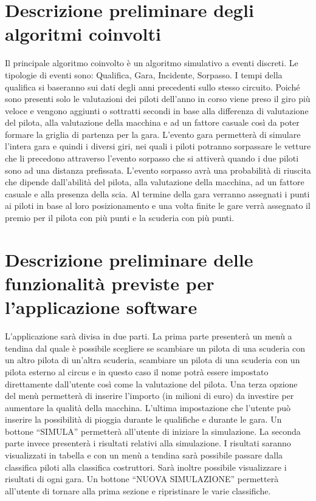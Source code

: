 \section[Descrizione preliminare degli algoritmi coinvolti]{Descrizione preliminare degli algoritmi coinvolti} %
Il principale algoritmo coinvolto è un algoritmo simulativo a eventi discreti. Le tipologie di eventi sono: Qualifica, Gara, Incidente, Sorpasso. I tempi della qualifica si baseranno sui dati degli anni precedenti sullo stesso circuito. Poiché sono presenti solo le valutazioni dei piloti dell’anno in corso viene preso il giro più veloce e vengono aggiunti o sottratti secondi in base alla differenza di valutazione del pilota, alla valutazione della macchina e ad un fattore casuale così da poter formare la griglia di partenza per la gara. L’evento gara permetterà di simulare l’intera gara e quindi i diversi giri, nei quali i piloti potranno sorpassare le vetture che li precedono attraverso l’evento sorpasso che si attiverà quando i due piloti sono ad una distanza prefissata. L’evento sorpasso avrà una probabilità di riuscita che dipende dall’abilità del pilota, alla valutazione della macchina, ad un fattore casuale e alla presenza della scia. Al termine della gara verranno assegnati i punti ai piloti in base al loro posizionamento e una volta finite le gare verrà assegnato il premio per il pilota con più punti e la scuderia con più punti.
\section[Descrizione preliminare delle funzionalità previste per l’applicazione software]{Descrizione preliminare delle funzionalità previste per l’applicazione software}
L’applicazione sarà divisa in due parti. 
La prima parte presenterà un menù a tendina dal quale è possibile scegliere se scambiare un pilota di una scuderia con un altro pilota di un’altra scuderia, scambiare un pilota di una scuderia con un pilota esterno al circus e in questo caso il nome potrà essere impostato direttamente dall’utente così come la valutazione del pilota. Una terza opzione del menù permetterà di inserire l’importo (in milioni di euro) da investire per aumentare la qualità della macchina. L’ultima impostazione che l’utente può inserire la possibilità di pioggia durante le qualifiche e durante le gara. Un bottone “SIMULA” permetterà all’utente di iniziare la simulazione.
La seconda parte invece presenterà i risultati relativi alla simulazione. I risultati saranno visualizzati in tabella e con un menù a tendina sarà possibile passare dalla classifica piloti alla classifica costruttori. Sarà inoltre possibile visualizzare i risultati di ogni gara. Un bottone “NUOVA SIMULAZIONE” permetterà all’utente di tornare alla prima sezione e ripristinare le varie classifiche.

